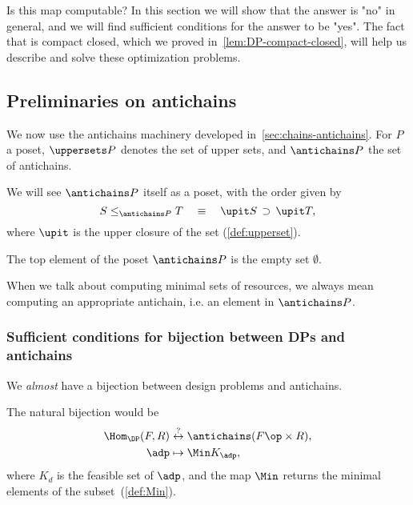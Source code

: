 Is this map computable? In this section we will show that the answer is "no" in general, and we will find sufficient conditions for the answer to be "yes". The fact that \DP is compact closed, which we proved in~\cref{lem:DP-compact-closed}, will help us describe and solve these optimization problems.

\subsection{Preliminaries on antichains}

We now use the antichains machinery developed in~\cref{sec:chains-antichains}. For $P$ a poset, $\uppersets P$ denotes the set of upper sets, and $\antichains P$ the set of antichains.


We will see $\antichains P$ itself as a poset, with the order given by
\begin{equation*}
    S \leq_{\antichains P} T  \quad \equiv \quad\upit S\, \supset\,\upit T,
\end{equation*}
where $\upit$ is the upper closure of the set (\cref{def:upperset}).

The top element of the poset $\antichains P$ is the empty set $\emptyset$.

When we talk about computing minimal sets of resources, we always mean computing an appropriate antichain, i.e. an element in $\antichains P$.

\subsubsection{Sufficient conditions for bijection between DPs and antichains}

We \emph{almost} have a bijection between design problems and antichains.

The natural bijection would be
\begin{equation}
    \begin{aligned}
        \Hom_\DP(F,R) &\overset{?}{\leftrightarrow} \antichains (F\op \times R), \\
        \adp &\mapsto \Min K_\adp,
    \end{aligned}
\end{equation}
where $K_d$ is the feasible set of $\adp$,
and the map $\Min$ returns the minimal elements of the subset~(\cref{def:Min}).

